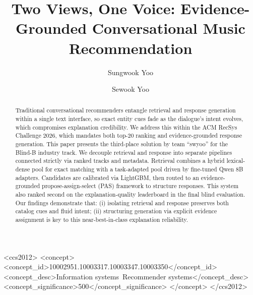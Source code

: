 \documentclass[sigconf]{acmart}
\begin{document}
\title[Two Views, One Voice]
{Two Views, One Voice: Evidence-Grounded Conversational Music Recommendation}

\author{Sungwook Yoo}

\author{Sewook Yoo}
\authornotemark[1]

\begin{abstract}
Traditional conversational recommenders entangle retrieval and response generation within a single text interface, so exact entity cues fade as the dialogue's intent evolves, which compromises explanation credibility. We address this within the ACM RecSys Challenge 2026, which mandates both top-20 ranking and evidence-grounded response generation. This paper presents the third-place solution by team ``swyoo'' for the Blind-B industry track. We decouple retrieval and response into separate pipelines connected strictly via ranked tracks and metadata. Retrieval combines a hybrid lexical-dense pool for exact matching with a task-adapted pool driven by fine-tuned Qwen 8B adapters. Candidates are calibrated via LightGBM, then routed to an evidence-grounded propose-assign-select (PAS) framework to structure responses. This system also ranked second on the explanation-quality leaderboard in the final blind evaluation. Our findings demonstrate that: (i) isolating retrieval and response preserves both catalog cues and fluid intent; (ii) structuring generation via explicit evidence assignment is key to this near-best-in-class explanation reliability.
\end{abstract}

\begin{CCSXML}
<ccs2012>
<concept>
<concept_id>10002951.10003317.10003347.10003350</concept_id>
<concept_desc>Information systems~Recommender systems</concept_desc>
<concept_significance>500</concept_significance>
</concept>
</ccs2012>
\end{CCSXML}


\maketitle
\end{document}
